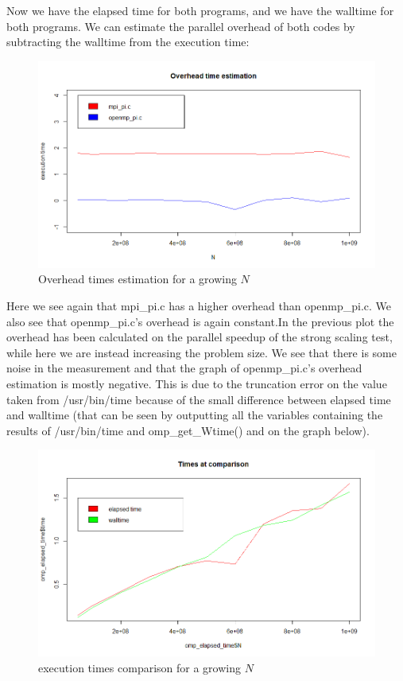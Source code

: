 \documentclass{article}
\begin{document}
Now we have the elapsed time for both programs, and we have the walltime for both programs.
We can estimate the parallel overhead of both codes by subtracting the walltime from the execution time:

\begin{figure}[H] %
	\centering
	\includegraphics[width=0.9\columnwidth]{graphs/final_overhead.png} %
	\caption{Overhead times estimation for a growing $N$}
	 \label{fig:overhead_graph}
\end{figure}
Here we see again that mpi\_pi.c has a higher overhead than openmp\_pi.c. We also see that openmp\_pi.c's overhead is again constant.In the previous plot the overhead has been calculated on the parallel speedup of the strong scaling test, while here we are instead increasing the problem size.
We see that there is some noise in the measurement and that the graph of openmp\_pi.c's overhead estimation is mostly negative.
This is due to the truncation error on the value taken from /usr/bin/time because of the small difference between elapsed time and walltime (that can be seen by outputting all the variables containing the results of /usr/bin/time and omp\_get\_Wtime() and on the graph below).

\begin{figure}[H] %
	\centering
	\includegraphics[width=0.9\columnwidth]{graphs/times_comparison_openmp_pi.png} %
	\caption{execution times comparison for a growing $N$}
\end{figure}
\end{document}

